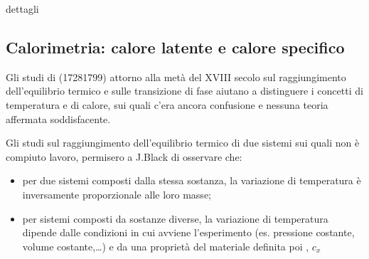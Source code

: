 \documentclass[letterpaper,10pt,italian]{jupyterBook}
\begin{document}
\sphinxAtStartPar
 dettagli 


\subsection{Calorimetria: calore latente e calore specifico}
\label{\detokenize{ch/thermodynamics/foundation-experiments:calorimetria-calore-latente-e-calore-specifico}}\label{\detokenize{ch/thermodynamics/foundation-experiments:physics-hs-thermodynamics-foundation-experiments-calorimetry}}
\sphinxAtStartPar
Gli studi di  (1728\sphinxhyphen{}1799) attorno alla metà del XVIII secolo sul raggiungimento dell’equilibrio termico e sulle transizione di fase aiutano a distinguere i concetti di temperatura e di calore, sui quali c’era ancora confusione e nessuna teoria affermata soddisfacente.

\sphinxAtStartPar
Gli studi sul raggiungimento dell’equilibrio termico di due sistemi sui quali non è compiuto lavoro, permisero a J.Black di osservare che:
\begin{itemize}
\item {} 
\sphinxAtStartPar
per due sistemi composti dalla stessa sostanza, la variazione di temperatura è inversamente proporzionale alle loro masse;

\item {} 
\sphinxAtStartPar
per sistemi composti da sostanze diverse, la variazione di temperatura dipende dalle condizioni in cui avviene l’esperimento (es. pressione costante, volume costante,…) e da una proprietà del materiale definita poi , \(c_x\)

\end{itemize}
\end{document}
